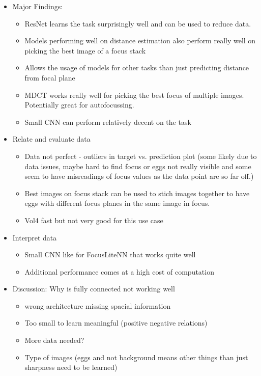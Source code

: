 \begin{itemize}
    \item Major Findings:
    \begin{itemize}
        \item ResNet learns the task surprisingly well and can be used to reduce data.
        \item Models performing well on distance estimation also perform really well on picking the best image of a focus stack
        \item Allows the usage of models for other tasks than just predicting distance from focal plane
        \item MDCT works really well for picking the best focus of multiple images. Potentially great for autofocussing.
        \item Small CNN can perform relatively decent on the task
    \end{itemize}
    \item Relate and evaluate data
    \begin{itemize}
        \item Data not perfect - outliers in target vs. prediction plot (some likely due to data issues, maybe hard to find focus or eggs not really visible and some seem to have misreadings of focus values as the data point are so far off.)
        \item Best images on focus stack can be used to stich images together to have eggs with different focus planes in the same image in focus.
        \item Vol4 fast but not very good for this use case
    \end{itemize}
    \item Interpret data
    \begin{itemize}
        \item Small CNN like for FocusLiteNN that works quite well
        \item Additional performance comes at a high cost of computation
    \end{itemize}
    \item Discussion: Why is fully connected not working well
    \begin{itemize}
        \item wrong architecture missing spacial information
        \item Too small to learn meaningful (positive negative relations)
        \item More data needed?
        \item Type of images (eggs and not background means other things than just sharpness need to be learned)
    \end{itemize}
\end{itemize}


